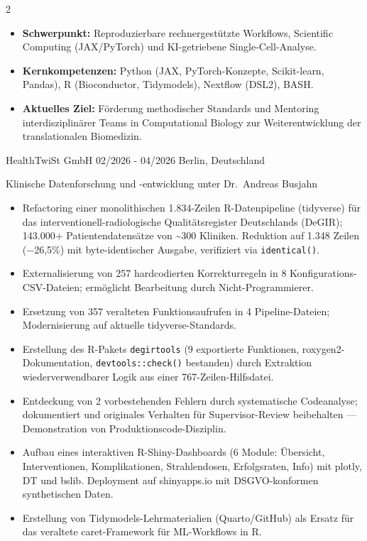 \documentclass{thejus_cv}
\begin{document}
\begin{paracol}{2}


\begin{itemize}[label=\textbullet, leftmargin=1em]
    \item \textbf{Schwerpunkt:} Reproduzierbare rechnergest\"utzte Workflows, Scientific Computing (JAX/PyTorch) und KI-getriebene Single-Cell-Analyse.
    \item \textbf{Kernkompetenzen:} Python (JAX, PyTorch-Konzepte, Scikit-learn, Pandas), R (Bioconductor, Tidymodels), Nextflow (DSL2), BASH.
    \item \textbf{Aktuelles Ziel:} F\"orderung methodischer Standards und Mentoring interdisziplin\"arer Teams in Computational Biology zur Weiterentwicklung der translationalen Biomedizin.
\end{itemize}


             {HealthTwiSt GmbH}
             {02/2026 - 04/2026}
             {Berlin, Deutschland}
             {Klinische Datenforschung und -entwicklung unter Dr.~Andreas Busjahn
             \begin{itemize}
                   \item Refactoring einer monolithischen 1.834-Zeilen R-Datenpipeline (tidyverse) f\"ur das interventionell-radiologische Qualit\"atsregister Deutschlands (DeGIR); 143.000+ Patientendatens\"atze von \textasciitilde300 Kliniken. Reduktion auf 1.348 Zeilen ($-$26,5\%) mit byte-identischer Ausgabe, verifiziert via \texttt{identical()}.
                   \item Externalisierung von 257 hardcodierten Korrekturregeln in 8 Konfigurations-CSV-Dateien; erm\"oglicht Bearbeitung durch Nicht-Programmierer.
                   \item Ersetzung von 357 veralteten Funktionsaufrufen in 4 Pipeline-Dateien; Modernisierung auf aktuelle tidyverse-Standards.
                   \item Erstellung des R-Pakets \texttt{degirtools} (9 exportierte Funktionen, roxygen2-Dokumentation, \texttt{devtools::check()} bestanden) durch Extraktion wiederverwendbarer Logik aus einer 767-Zeilen-Hilfsdatei.
                   \item Entdeckung von 2 vorbestehenden Fehlern durch systematische Codeanalyse; dokumentiert und originales Verhalten f\"ur Supervisor-Review beibehalten --- Demonstration von Produktionscode-Disziplin.
                   \item Aufbau eines interaktiven R-Shiny-Dashboards (6 Module: \"Ubersicht, Interventionen, Komplikationen, Strahlendosen, Erfolgsraten, Info) mit plotly, DT und bslib. Deployment auf shinyapps.io mit DSGVO-konformen synthetischen Daten.
                   \item Erstellung von Tidymodels-Lehrmaterialien (Quarto/GitHub) als Ersatz f\"ur das veraltete caret-Framework f\"ur ML-Workflows in R.
               \end{itemize}}


\end{paracol}
\end{document}
